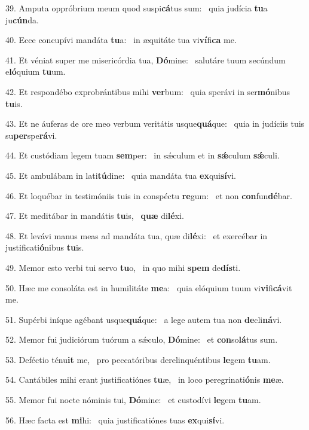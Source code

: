 39. Amputa oppróbrium meum quod suspi\textbf{cá}tus sum: \ast\  quia judícia \textbf{tu}a ju\textbf{cún}da.\

40. Ecce concupívi mandáta \textbf{tu}a: \ast\  in æquitáte tua vi\textbf{ví}fi\textbf{ca} me.\

41. Et véniat super me misericórdia tua, \textbf{Dó}mine: \ast\  salutáre tuum secúndum e\textbf{ló}quium \textbf{tu}um.\

42. Et respondébo exprobrántibus mihi \textbf{ver}bum: \ast\  quia sperávi in ser\textbf{mó}nibus \textbf{tu}is.\

43. Et ne áuferas de ore meo verbum veritátis usque\textbf{quá}que: \ast\  quia in judíciis tuis su\textbf{per}spe\textbf{rá}vi.\

44. Et custódiam legem tuam \textbf{sem}per: \ast\  in sǽculum et in \textbf{sǽ}culum \textbf{sǽ}culi.\

45. Et ambulábam in lati\textbf{tú}dine: \ast\  quia mandáta tua \textbf{ex}qui\textbf{sí}vi.\

46. Et loquébar in testimóniis tuis in conspéctu \textbf{re}gum: \ast\  et non \textbf{con}fun\textbf{dé}bar.\

47. Et meditábar in mandátis \textbf{tu}is, \ast\  \textbf{quæ} di\textbf{lé}xi.\

48. Et levávi manus meas ad mandáta tua, quæ di\textbf{lé}xi: \ast\  et exercébar in justificati\textbf{ó}nibus \textbf{tu}is.\

49. Memor esto verbi tui servo \textbf{tu}o, \ast\  in quo mihi \textbf{spem} de\textbf{dís}ti.\

50. Hæc me consoláta est in humilitáte \textbf{me}a: \ast\  quia elóquium tuum vi\textbf{vi}fi\textbf{cá}vit me.\

51. Supérbi iníque agébant usque\textbf{quá}que: \ast\  a lege autem tua non \textbf{de}cli\textbf{ná}vi.\

52. Memor fui judiciórum tuórum a sǽculo, \textbf{Dó}mine: \ast\  et \textbf{con}so\textbf{lá}tus sum.\

53. Deféctio ténu\textbf{it} me, \ast\  pro peccatóribus derelinquéntibus \textbf{le}gem \textbf{tu}am.\

54. Cantábiles mihi erant justificatiónes \textbf{tu}æ, \ast\  in loco peregrinati\textbf{ó}nis \textbf{me}æ.\

55. Memor fui nocte nóminis tui, \textbf{Dó}mine: \ast\  et custodívi \textbf{le}gem \textbf{tu}am.\

56. Hæc facta est \textbf{mi}hi: \ast\  quia justificatiónes tuas \textbf{ex}qui\textbf{sí}vi.\

